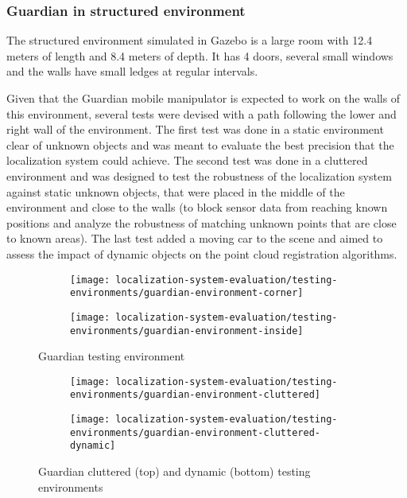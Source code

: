 \subsubsection{Guardian in structured environment}

The structured environment simulated in Gazebo is a large room with 12.4 meters of length and 8.4 meters of depth. It has 4 doors, several small windows and the walls have small ledges at regular intervals.

Given that the Guardian mobile manipulator is expected to work on the walls of this environment, several tests were devised with a path following the lower and right wall of the environment. The first test was done in a static environment clear of unknown objects and was meant to evaluate the best precision that the localization system could achieve. The second test was done in a cluttered environment and was designed to test the robustness of the localization system against static unknown objects, that were placed in the middle of the environment and close to the walls (to block sensor data from reaching known positions and analyze the robustness of matching unknown points that are close to known areas). The last test added a moving car to the scene and aimed to assess the impact of dynamic objects on the point cloud registration algorithms.


\begin{figure}[H]
	\centering
	\begin{subfigure}[ht]{0.4\textwidth}
		\centering
		\texttt{[image: localization-system-evaluation/testing-environments/guardian-environment-corner]}
	\end{subfigure}
	\begin{subfigure}[ht]{0.4\textwidth}
		\centering
		\texttt{[image: localization-system-evaluation/testing-environments/guardian-environment-inside]}
	\end{subfigure}
	\caption{Guardian testing environment}
	\label{fig:localization-system-evaluation_guardian-tests-environment}
\end{figure}

\begin{figure}[H]
	\centering
	\begin{subfigure}[ht]{0.39\textwidth}
		\centering
		\texttt{[image: localization-system-evaluation/testing-environments/guardian-environment-cluttered]}
	\end{subfigure}
	\begin{subfigure}[ht]{0.39\textwidth}
		\centering
		\texttt{[image: localization-system-evaluation/testing-environments/guardian-environment-cluttered-dynamic]}
	\end{subfigure}
	\caption{Guardian cluttered (top) and dynamic (bottom) testing environments}
	\label{fig:localization-system-evaluation_guardian-tests-environment-cluttered}
\end{figure}



